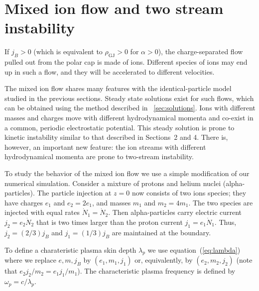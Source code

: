 
\section{Mixed ion flow and two stream instability}
\label{sec:pc-ions}


If $j_B>0$ (which is equivalent to $\rho_\mathrm{GJ}>0$ for $\alpha>0$), the
charge-separated flow pulled out from the polar cap is made of ions.
Different species of ions may end up in such a flow, and they will be
accelerated to different velocities.

The mixed ion flow shares many features with the identical-particle model
studied in the previous sections. Steady state solutions exist for such flows,
which can be obtained using the method described in \Sect~\ref{sec:solutions}.
Ions with different masses and charges move with different hydrodynamical
momenta and co-exist in a common, periodic electrostatic potential.
This steady solution
is prone to kinetic instability similar to that described in Sections~2 and 4.
%
There is, however, an important new feature: the ion streams with
different hydrodynamical momenta are prone to two-stream instability.

To study the behavior of the mixed ion flow we use a simple modification of
our numerical simulation. Consider a mixture of protons and helium nuclei
(alpha-particles).
The particle injection at $z=0$ now consists of two ions species; they have
charges $e_1$ and $e_2=2e_1$, and masses $m_1$ and $m_2=4m_1$.
The two species are injected with equal rates $\dot{N}_1=\dot{N}_2$.
Then alpha-particles carry electric current $j_2=e_2\dot{N}_2$ that is
two times larger than the proton current $j_1=e_1\dot{N}_1$. Thus,
$j_2=(2/3)j_B$ and $j_1=(1/3)j_B$ are maintained at the boundary.

To define a charateristic plasma skin depth $\lambda_p$ we use
equation~(\ref{eq:lambda}) where we replace $e,m,j_B$ by $(e_1,m_1,j_1)$
or, equivalently, by $(e_2,m_2,j_2)$ (note that $e_2j_2/m_2=e_1j_1/m_1$).
The characteristic plasma frequency is defined by $\omega_p=c/\lambda_p$.


